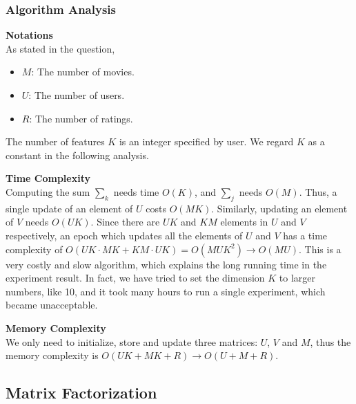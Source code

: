 \documentclass[12pt]{article}
\begin{document}
\subsubsection{Algorithm Analysis}
\noindent\textbf{Notations}\\
As stated in the question,
\begin{itemize}
    \item $M$: The number of movies.
    \item $U$: The number of users.
    \item $R$: The number of ratings.
\end{itemize}
The number of features $K$ is an integer specified by user. We regard $K$ as a constant in the following analysis.\par
\vspace{0.3cm}
\noindent\textbf{Time Complexity}\\
Computing the sum $\sum_{k}$ needs time $O(K)$, and $\sum_j$ needs $O(M)$. Thus, a single update of an element of $U$ costs $O(MK)$. Similarly, updating an element of $V$ needs $O(UK)$. Since there are $UK$ and $KM$ elements in $U$ and $V$ respectively, an epoch which updates all the elements of $U$ and $V$ has a time complexity of $O(UK\cdot MK+KM\cdot UK)=O(MUK^2)\rightarrow O(MU)$. This is a very costly and slow algorithm, which explains the long running time in the experiment result. In fact, we have tried to set the dimension $K$ to larger numbers, like 10, and it took many hours to run a single experiment, which became unacceptable.

\vspace{0.3cm}
\noindent\textbf{Memory Complexity}\\
We only need to initialize, store and update three matrices: $U$, $V$ and $M$, thus the memory complexity is $O(UK+MK+R)\rightarrow O(U+M+R)$.

\subsection{Matrix Factorization}
\end{document}
